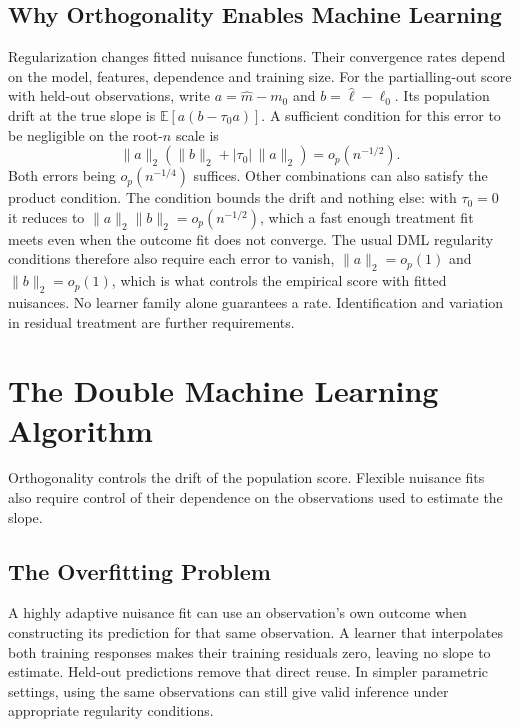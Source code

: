 \subsection{Why Orthogonality Enables Machine
Learning}\label{_why_orthogonality_enables_machine_learning}

Regularization changes fitted nuisance functions. Their convergence rates depend on the model, features, dependence and training size. For the partialling-out score with held-out observations, write \(a=\widehat m-m_0\) and \(b=\widehat\ell-\ell_0\). Its population drift at the true slope is \(\mathbb E[a(b-\tau_0a)]\). A sufficient condition for this error to be negligible on the root-\(n\) scale is
\[
\|a\|_2(\|b\|_2+|\tau_0|\,\|a\|_2)=o_p(n^{-1/2}).
\]
Both errors being \(o_p(n^{-1/4})\) suffices. Other combinations can also satisfy the product condition. The condition bounds the drift and nothing else: with \(\tau_0=0\) it reduces to \(\|a\|_2\|b\|_2=o_p(n^{-1/2})\), which a fast enough treatment fit meets even when the outcome fit does not converge. The usual DML regularity conditions therefore also require each error to vanish, \(\|a\|_2=o_p(1)\) and \(\|b\|_2=o_p(1)\), which is what controls the empirical score with fitted nuisances. No learner family alone guarantees a rate. Identification and variation in residual treatment are further requirements.

\section{The Double Machine Learning
Algorithm}\label{_the_double_machine_learning_algorithm}

Orthogonality controls the drift of the population score. Flexible nuisance fits also require control of their dependence on the observations used to estimate the slope.

\subsection{The Overfitting Problem}\label{_the_overfitting_problem}

A highly adaptive nuisance fit can use an observation's own outcome when constructing its prediction for that same observation. A learner that interpolates both training responses makes their training residuals zero, leaving no slope to estimate. Held-out predictions remove that direct reuse. In simpler parametric settings, using the same observations can still give valid inference under appropriate regularity conditions.

